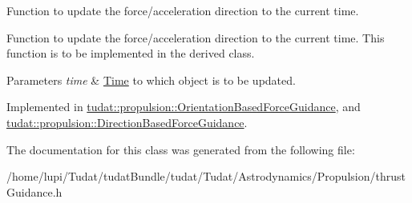 Function to update the force/acceleration direction to the current time. 

Function to update the force/acceleration direction to the current time. This function is to be implemented in the derived class. 
\begin{DoxyParams}{Parameters}
{\em time} & \hyperlink{classtudat_1_1Time}{Time} to which object is to be updated. \\
\hline
\end{DoxyParams}


Implemented in \hyperlink{classtudat_1_1propulsion_1_1OrientationBasedForceGuidance_a4cd7dfac54b8948ecceb14a4565a1160}{tudat\+::propulsion\+::\+Orientation\+Based\+Force\+Guidance}, and \hyperlink{classtudat_1_1propulsion_1_1DirectionBasedForceGuidance_a4051907f746166d8d7fc9814b3e82192}{tudat\+::propulsion\+::\+Direction\+Based\+Force\+Guidance}.



The documentation for this class was generated from the following file\+:\begin{DoxyCompactItemize}
\item 
/home/lupi/\+Tudat/tudat\+Bundle/tudat/\+Tudat/\+Astrodynamics/\+Propulsion/thrust\+Guidance.\+h\end{DoxyCompactItemize}
